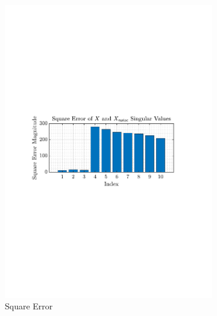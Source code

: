 \documentclass[12pt]{article}
\begin{document}
\begin{figure}[H]
\begin{subfigure}{0.49\textwidth}
			\includegraphics[trim={2.2cm 11.2cm 3.15cm  11.2cm}, clip, width=\textwidth]{../MATLAB/figures/q1_6a_fig02.pdf} 
			\captionsetup{justification=centering}
			\caption{Square Error}
		\end{subfigure}
		\captionsetup{justification=centering}
		\caption{}
		\label{fig: 1-6a}
	\end{figure}
 
\end{document}
